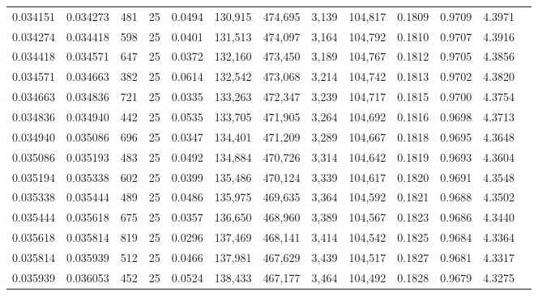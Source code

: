 \begin{tabular}{rrrrrrrrrrrrr}
0.034151 & 0.034273 &   481 &  25 &                                     0.0494 & 130,915 & 474,695 &   3,139 & 104,817 & 0.1809 & 0.9709 & 4.3971 \\
0.034274 & 0.034418 &   598 &  25 &                                     0.0401 & 131,513 & 474,097 &   3,164 & 104,792 & 0.1810 & 0.9707 & 4.3916 \\
0.034418 & 0.034571 &   647 &  25 &                                     0.0372 & 132,160 & 473,450 &   3,189 & 104,767 & 0.1812 & 0.9705 & 4.3856 \\
0.034571 & 0.034663 &   382 &  25 &                                     0.0614 & 132,542 & 473,068 &   3,214 & 104,742 & 0.1813 & 0.9702 & 4.3820 \\
0.034663 & 0.034836 &   721 &  25 &                                     0.0335 & 133,263 & 472,347 &   3,239 & 104,717 & 0.1815 & 0.9700 & 4.3754 \\
0.034836 & 0.034940 &   442 &  25 &                                     0.0535 & 133,705 & 471,905 &   3,264 & 104,692 & 0.1816 & 0.9698 & 4.3713 \\
0.034940 & 0.035086 &   696 &  25 &                                     0.0347 & 134,401 & 471,209 &   3,289 & 104,667 & 0.1818 & 0.9695 & 4.3648 \\
0.035086 & 0.035193 &   483 &  25 &                                     0.0492 & 134,884 & 470,726 &   3,314 & 104,642 & 0.1819 & 0.9693 & 4.3604 \\
0.035194 & 0.035338 &   602 &  25 &                                     0.0399 & 135,486 & 470,124 &   3,339 & 104,617 & 0.1820 & 0.9691 & 4.3548 \\
0.035338 & 0.035444 &   489 &  25 &                                     0.0486 & 135,975 & 469,635 &   3,364 & 104,592 & 0.1821 & 0.9688 & 4.3502 \\
0.035444 & 0.035618 &   675 &  25 &                                     0.0357 & 136,650 & 468,960 &   3,389 & 104,567 & 0.1823 & 0.9686 & 4.3440 \\
0.035618 & 0.035814 &   819 &  25 &                                     0.0296 & 137,469 & 468,141 &   3,414 & 104,542 & 0.1825 & 0.9684 & 4.3364 \\
0.035814 & 0.035939 &   512 &  25 &                                     0.0466 & 137,981 & 467,629 &   3,439 & 104,517 & 0.1827 & 0.9681 & 4.3317 \\
0.035939 & 0.036053 &   452 &  25 &                                     0.0524 & 138,433 & 467,177 &   3,464 & 104,492 & 0.1828 & 0.9679 & 4.3275 \\

\end{tabular}
